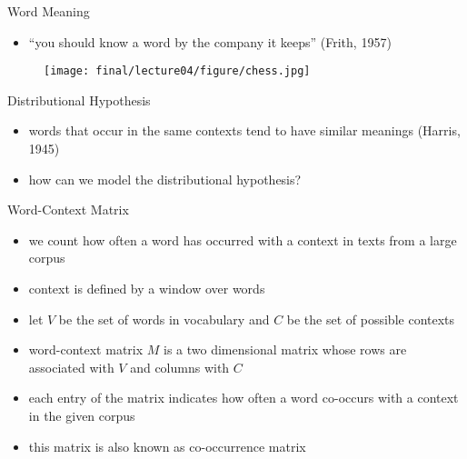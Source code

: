 \begin{frame}{Word Meaning}
\begin{itemize}
    \item<1-> ``you should know a word by the company it keeps'' (Frith, 1957)
\end{itemize}
\begin{figure}
    \centering
    \texttt{[image: final/lecture04/figure/chess.jpg]}
\end{figure}
\end{frame}
\begin{frame}{Distributional Hypothesis}
\begin{itemize}
    \item<1-> words that occur in the same contexts tend to have similar meanings (Harris, 1945)
    \item<2-> how can we model the distributional hypothesis?
\end{itemize}
\end{frame}
\begin{frame}{Word-Context Matrix}
\begin{itemize}
    \item<1-> we count how often a word has occurred with a context in texts from a large corpus
    \item<2-> context is defined by a window over words
    \item<3-> let $V$ be the set of words in vocabulary and $C$ be the set of possible contexts
    \item<4-> word-context matrix $M$ is a two dimensional matrix whose rows are associated with $V$ and columns with $C$
    \item<5-> each entry of the matrix indicates how often a word co-occurs with a context in the given corpus
    \item<6-> this matrix is also known as co-occurrence matrix
\end{itemize}
\end{frame}
